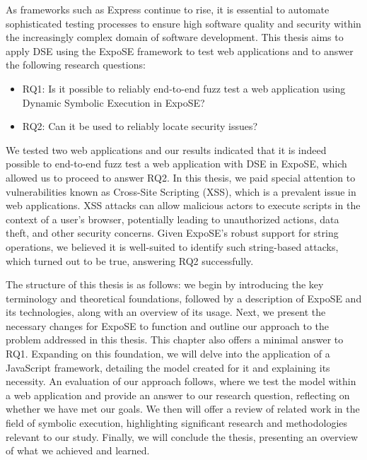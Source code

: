 As frameworks such as Express continue to rise, it is essential to automate sophisticated testing processes to ensure high software quality and security within the increasingly complex domain of software development. This thesis aims to apply DSE using the ExpoSE framework to test web applications and to answer the following research questions:

\begin{itemize}
    \item RQ1: Is it possible to reliably end-to-end fuzz test a web application using Dynamic Symbolic Execution in ExpoSE?
    \item RQ2: Can it be used to reliably locate security issues?
\end{itemize}

We tested two web applications and our results indicated that it is indeed possible to end-to-end fuzz test a web application with DSE in ExpoSE, which allowed us to proceed to answer RQ2.
In this thesis, we paid special attention to vulnerabilities known as Cross-Site Scripting (XSS), which is a prevalent issue in web applications. XSS attacks can allow malicious actors to execute scripts in the context of a user's browser, potentially leading to unauthorized actions, data theft, and other security concerns. Given ExpoSE's robust support for string operations, we believed it is well-suited to identify such string-based attacks, which turned out to be true, answering RQ2 successfully.


The structure of this thesis is as follows: we begin by introducing the key terminology and theoretical foundations, followed by a description of ExpoSE and its technologies, along with an overview of its usage.
Next, we present the necessary changes for ExpoSE to function and outline our approach to the problem addressed in this thesis. This chapter also offers a minimal answer to RQ1.
Expanding on this foundation, we will delve into the application of a JavaScript framework, detailing the model created for it and explaining its necessity. 
An evaluation of our approach follows,  where we test the model within a web application and provide an answer to our research question, reflecting on whether we have met our goals.
We then will offer a review of related work in the field of symbolic execution, highlighting significant research and methodologies relevant to our study. 
Finally, we will conclude the thesis, presenting an overview of what we achieved and learned.